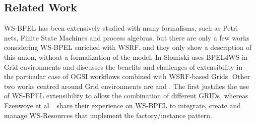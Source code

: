 \subsection{Related Work}

WS-BPEL has been extensively studied with many formalisms, such as
Petri nets, Finite State Machines and process algebras, but 
there are only a few works considering WS-BPEL enriched with 
WSRF, and they only show a description of this union, 
without a formalization of the model.
In \cite{Slomiski:2006} Slomiski uses BPEL4WS in Grid environments and discusses the
benefits and challenges of extensibility in the particular case of OGSI workflows
combined with WSRF-based Grids. Other two works centred around Grid environments are 
\cite{Leymann:2006} and \cite{Ezenwoye:2007}. The first justifies 
the use of WS-BPEL extensibility to allow the combination of different GRIDs, whereas
Ezenwoye et al.~\cite{Ezenwoye:2007} share their experience on WS-BPEL to integrate,
create and manage WS-Resources that implement the factory/instance pattern.

